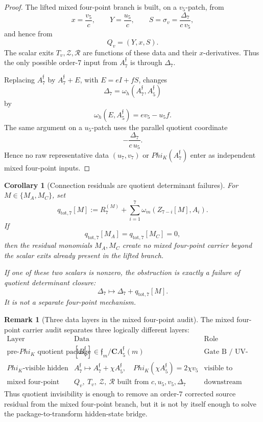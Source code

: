 \documentclass[11pt,a4paper]{amsart}
\def\Phi{Phi}%
\theoremstyle{plain}
\newtheorem{corollary}[theorem]{Corollary}
\theoremstyle{definition}
\newtheorem{remark}[theorem]{Remark}
\begin{document}
\begin{proof}
The lifted mixed four-point branch is built, on a \(v_5\)-patch, from
\[
x=\frac{v_5}{c},
\qquad
Y=\frac{u_5}{c},
\qquad
S=\sigma_v=\frac{\Delta_7}{c\,v_5},
\]
and hence from
\[
Q_v=(Y,x,S).
\]
The scalar exits \(T_v,\mathcal Z,\mathcal R\) are functions of these data and
their \(x\)-derivatives.  Thus the only possible order-\(7\) input from
\(A_7^{\mathfrak f}\) is through \(\Delta_7\).

Replacing \(A_7^{\mathfrak f}\) by \(A_7^{\mathfrak f}+E\), with
\(E=eI+fS\), changes
\[
\Delta_7=\omega_h(A_7^{\mathfrak f},A_5^{\mathfrak f})
\]
by
\[
\omega_h(E,A_5^{\mathfrak f})
=
ev_5-u_5f.
\]
The same argument on a \(u_5\)-patch uses the parallel quotient coordinate
\[
-\frac{\Delta_7}{c\,u_5}.
\]
Hence no raw representative data \((u_7,v_7)\) or
\(\Phi_K(A_7^{\mathfrak f})\) enter as independent mixed four-point inputs.
\end{proof}

\begin{corollary}[Connection residuals are quotient determinant failures]
\label{cor:connection-residuals-are-quotient-determinant-failures}
For \(M\in\{M_A,M_C\}\), set
\[
q_{\mathrm{tot},7}[M]
:=
R_7^{(M)}
+
\sum_{i=1}^{7}\omega_m(Z_{7-i}[M],A_i).
\]
If
\[
q_{\mathrm{tot},7}[M_A]=q_{\mathrm{tot},7}[M_C]=0,
\]
then the residual monomials \(M_A,M_C\) create no mixed four-point carrier
beyond the scalar exits already present in the lifted branch.

If one of these two scalars is nonzero, the obstruction is exactly a failure
of quotient determinant closure:
\[
\Delta_7\longmapsto \Delta_7+q_{\mathrm{tot},7}[M].
\]
It is not a separate four-point mechanism.
\end{corollary}

\begin{remark}[Three data layers in the mixed four-point audit]
\label{rem:three-data-layers-mixed-four-point-audit}
The mixed four-point carrier audit separates three logically different layers:
\[
\begin{array}{c|c|c}
\text{Layer} & \text{Data} & \text{Role} \\
\hline
\text{pre-}\Phi_K\text{ quotient package}
&
[B_7^{\mathfrak f}]
\in
\mathfrak f_m/\mathbf C A_5^{\mathfrak f}(m)
&
\text{Gate B / UV-026 obstruction object}
\\[0.8ex]
\Phi_K\text{-visible hidden state}
&
A_7^{\mathfrak f}\mapsto
A_7^{\mathfrak f}+\chi A_5^{\mathfrak f},
\quad
\Phi_K(\chi A_5^{\mathfrak f})=2\chi v_5
&
\text{visible to transform extraction, quotient-invisible}
\\[0.8ex]
\text{mixed four-point scalar exits}
&
Q_v,\ T_v,\ \mathcal Z,\ \mathcal R
\text{ built from }
c,u_5,v_5,\Delta_7
&
\text{downstream four-point branch geometry}
\end{array}
\]
Thus quotient invisibility is enough to remove an order-\(7\) corrected source
residual from the mixed four-point branch, but it is not by itself enough to
solve the package-to-transform hidden-state bridge.
\end{remark}
\end{document}
